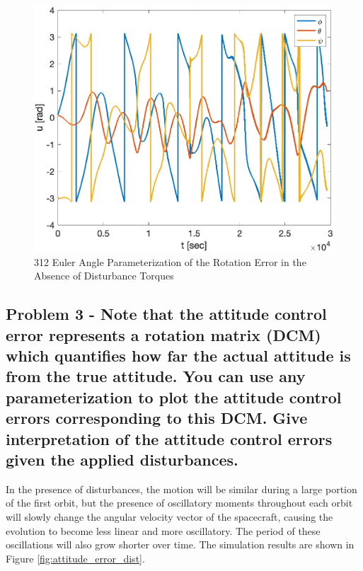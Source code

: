 \begin{figure}[H]
    \centering
    \captionsetup{ justification = centering }
    \includegraphics[width = 12cm]{Images/PS6/attitude_error_no_dist.png}
    \caption{312 Euler Angle Parameterization of the Rotation Error in the Absence of Disturbance Torques}
    \label{fig:attitude_error_no_dist}
\end{figure}

\subsection{Problem 3 - Note that the attitude control error represents a rotation matrix (DCM) which quantifies how far the actual attitude is from the true attitude. You can use any parameterization to plot the attitude control errors corresponding to this DCM. Give interpretation of the attitude control errors given the applied disturbances.}

In the presence of disturbances, the motion will be similar during a large portion of the first orbit, but the presence of oscillatory moments throughout each orbit will slowly change the angular velocity vector of the spacecraft, causing the evolution to become less linear and more oscillatory. The period of these oscillations will also grow shorter over time. The simulation results are shown in Figure \ref{fig:attitude_error_dist}.


